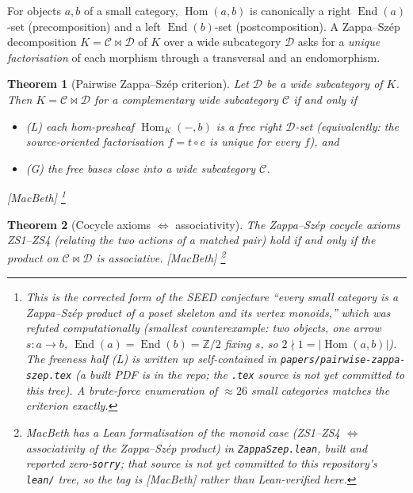 \documentclass[11pt,a4paper]{book}
\DeclareMathOperator{\Hom}{Hom}
\DeclareMathOperator{\End}{End}
\theoremstyle{plain}
\newtheorem{Theorem}{Theorem}[chapter]
\theoremstyle{definition}
\theoremstyle{remark}
\newcommand{\prov}[1]{\hfill\textsf{\footnotesize[#1]}}
\begin{document}
For objects $a,b$ of a small category, $\Hom(a,b)$ is canonically a right
$\End(a)$-set (precomposition) and a left $\End(b)$-set (postcomposition). A
Zappa--Sz\'ep decomposition $K=\mathcal C\bowtie\mathcal D$ of $K$ over a wide
subcategory $\mathcal D$ asks for a \emph{unique factorisation} of each morphism
through a transversal and an endomorphism.

\begin{Theorem}[Pairwise Zappa--Sz\'ep criterion]\label{thm:zscriterion}
Let $\mathcal D$ be a wide subcategory of $K$. Then $K=\mathcal C\bowtie\mathcal D$
for a complementary wide subcategory $\mathcal C$ if and only if
\begin{itemize}[nosep]
  \item \textup{(L)} each hom-presheaf $\Hom_K(-,b)$ is a \emph{free} right
        $\mathcal D$-set (equivalently: the source-oriented factorisation
        $f=t\circ e$ is unique for every $f$), and
  \item \textup{(G)} the free bases close into a wide subcategory $\mathcal C$.
\end{itemize}
\prov{MacBeth}%
\footnote{This is the corrected form of the SEED conjecture ``every small category
is a Zappa--Sz\'ep product of a poset skeleton and its vertex monoids,'' which was
\emph{refuted} computationally (smallest counterexample: two objects, one arrow
$s\colon a\to b$, $\End(a)=\End(b)=\mathbb Z/2$ fixing $s$, so
$2\nmid 1=|\Hom(a,b)|$). The freeness half (L) is written up self-contained in
\texttt{papers/pairwise-zappa-szep.tex} (a built PDF is in the repo; the
\texttt{.tex} source is not yet committed to this tree). A brute-force enumeration
of $\approx 26$ small categories matches the criterion exactly.}
\end{Theorem}

\begin{Theorem}[Cocycle axioms $\Longleftrightarrow$ associativity]\label{thm:zsassoc}
The Zappa--Sz\'ep cocycle axioms ZS1--ZS4 (relating the two actions of a matched
pair) hold if and only if the product on $\mathcal C\bowtie\mathcal D$ is
associative.
\prov{MacBeth}%
\footnote{MacBeth has a Lean formalisation of the monoid case (ZS1--ZS4
$\Longleftrightarrow$ associativity of the Zappa--Sz\'ep product) in
\texttt{ZappaSzep.lean}, built and reported zero-\texttt{sorry}; that source is
\emph{not yet committed} to this repository's \texttt{lean/} tree, so the tag is
\textsf{[MacBeth]} rather than \textsf{Lean-verified} here.}
\end{Theorem}
\end{document}
